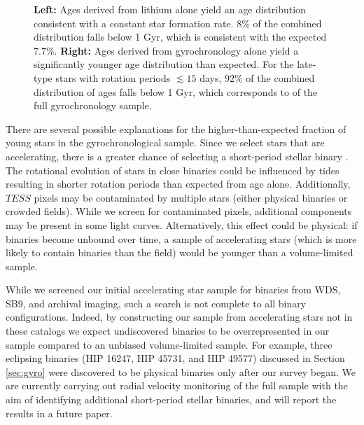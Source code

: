 {\begin{figure}[ht!]
 \caption{{\bf Left:} Ages derived from lithium alone yield an age distribution consistent with a constant star formation rate. $8\%$ of the combined distribution falls below 1 Gyr, which is consistent with the expected $7.7\%$. {\bf Right:} Ages derived from gyrochronology alone yield a significantly younger age distribution than expected. For the  late-type stars with rotation periods $\lesssim15$ days, $92\%$ of the combined distribution of ages falls below 1 Gyr, which corresponds to  of the full gyrochronology sample.}
 \label{LiGyroPost}
\end{figure}

There are several possible explanations for the higher-than-expected fraction of young stars in the gyrochronological sample. Since we select stars that are accelerating, there is a greater chance of selecting a short-period stellar binary . The rotational evolution of stars in close binaries could be influenced by tides resulting in shorter rotation periods than expected from age alone. Additionally,  $TESS$ pixels may be contaminated by multiple stars (either physical binaries or crowded fields). While we screen for contaminated pixels, additional components may be present in some light curves. Alternatively, this effect could be physical: if binaries become unbound over time, a sample of accelerating stars (which is more likely to contain binaries than the field) would be younger than a volume-limited sample.

While we screened our initial accelerating star sample for binaries from WDS, SB9, and archival imaging, such a search is not complete to all binary configurations. Indeed, by constructing our sample from accelerating stars not in these catalogs we expect undiscovered binaries to be overrepresented in our sample compared to an unbiased volume-limited sample. For example, three eclipsing binaries (HIP 16247, HIP 45731, and HIP 49577) discussed in Section \ref{sec:gyro} were discovered to be physical binaries only after our survey began. We are currently carrying out radial velocity monitoring of the full sample with the aim of identifying additional short-period stellar binaries, and will report the results in a future paper.}

